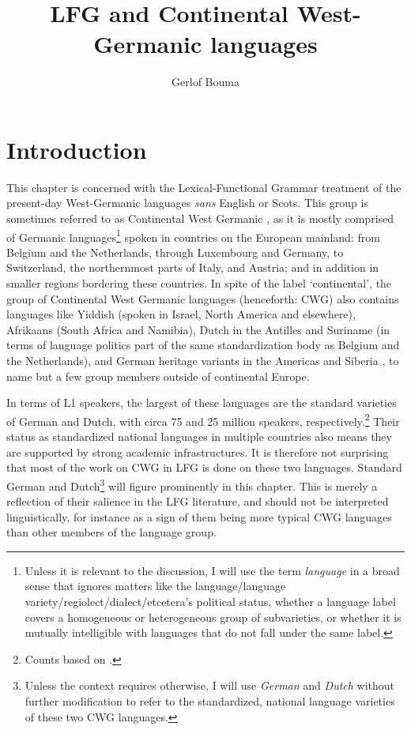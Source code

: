 \documentclass[output=paper,hidelinks]{langscibook}
\title{LFG and Continental West-Germanic languages}
\author{Gerlof Bouma\affiliation{University of Gothenburg}}
\begin{document}
\maketitle
\label{chap:WestGermanic}

\section{Introduction\label{sec:Germanic:intro}}

This chapter is concerned with the Lexical-Functional Grammar
treatment of the present-day West-Germanic languages \textit{sans}
English or Scots. This group is sometimes referred to as Continental
West Germanic \citep{zwart:2008}, as it is mostly comprised of
Germanic languages\footnote{Unless it is relevant to the discussion, I
will use the term \textit{language} in a broad sense that ignores
matters like the language/language
variety/regiolect/dialect/etcetera's political status, whether a
language label covers a homogeneous or heterogeneous group of
subvarieties, or whether it is mutually intelligible with languages
that do not fall under the same label.} spoken in countries on the
European mainland: from Belgium and the Netherlands, through
Luxembourg and Germany, to Switzerland, the northernmost parts of
Italy, and Austria; and in addition in smaller regions bordering these
countries. In spite of the label `continental', the group of
Continental West Germanic languages (henceforth: CWG) also contains
languages like Yiddish (spoken in Israel, North America and elsewhere), Afrikaans (South Africa and Namibia), Dutch in the
Antilles and Suriname (in terms of language politics part of the same
standardization body as Belgium and the Netherlands), and German
heritage variants in the Americas \citep{putnam:2011} and Siberia
\citep{andersen:2016}, to name but a few group members outside of
continental Europe.

In terms of L1 speakers, the largest of these languages are the standard
varieties of German and Dutch, with circa 75 and 25 million speakers,
respectively.\footnote{Counts based on
\citet{EberhardSimonsFennig2019}.}  Their status as standardized
national languages in multiple countries also means they are supported
by strong academic infrastructures. It is therefore not surprising
that most of the work on CWG in LFG is done on these two
languages. Standard German and Dutch\footnote{Unless the context requires otherwise,  I will use \textit{German} and \textit{Dutch} without further modification to refer to the standardized, national language varieties of these two CWG languages.} will figure prominently in this
chapter. This is merely a reflection of their salience in the LFG
literature, and should not be interpreted linguistically, for instance
as a sign of them being more typical CWG languages than other members of the
language group.
\end{document}
